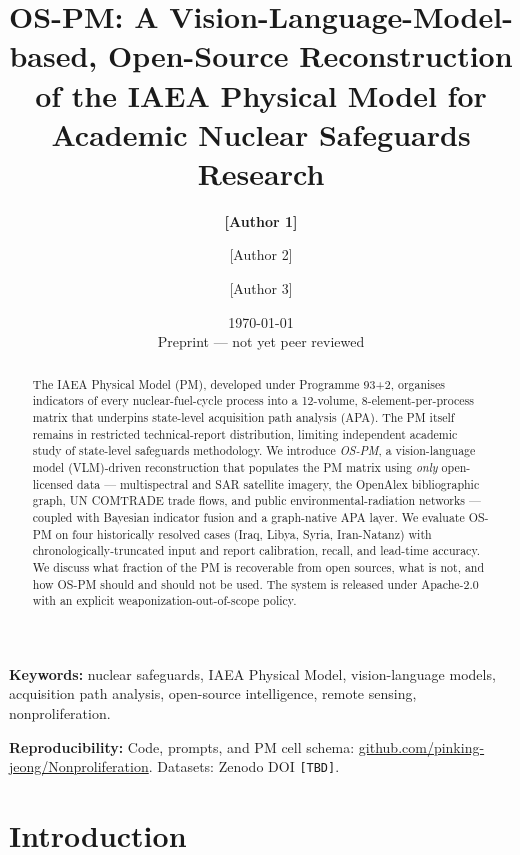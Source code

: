 \documentclass[11pt,a4paper]{article}
\title{\textbf{OS-PM: A Vision-Language-Model-based, Open-Source
  Reconstruction of the IAEA Physical Model for Academic Nuclear
  Safeguards Research}}
\author[1]{\textbf{[Author 1]}}
\author[1]{[Author 2]}
\author[2]{[Author 3]}
\affil[1]{[Institution 1, Country]}
\affil[2]{[Institution 2, Country]}
\date{\today\\[2pt]\small Preprint --- not yet peer reviewed}
\begin{document}
\maketitle

\begin{abstract}
The IAEA Physical Model (PM), developed under Programme 93+2, organises
indicators of every nuclear-fuel-cycle process into a 12-volume,
8-element-per-process matrix that underpins state-level acquisition path
analysis (APA). The PM itself remains in restricted technical-report
distribution, limiting independent academic study of state-level
safeguards methodology. We introduce \emph{OS-PM}, a vision-language
model (VLM)-driven reconstruction that populates the PM matrix using
\emph{only} open-licensed data --- multispectral and SAR satellite
imagery, the OpenAlex bibliographic graph, UN COMTRADE trade flows, and
public environmental-radiation networks --- coupled with Bayesian
indicator fusion and a graph-native APA layer. We evaluate OS-PM on four
historically resolved cases (Iraq, Libya, Syria, Iran-Natanz) with
chronologically-truncated input and report calibration, recall, and
lead-time accuracy. We discuss what fraction of the PM is recoverable
from open sources, what is not, and how OS-PM should and should not be
used. The system is released under Apache-2.0 with an explicit
weaponization-out-of-scope policy.
\end{abstract}

\textbf{Keywords:} nuclear safeguards, IAEA Physical Model, vision-language
models, acquisition path analysis, open-source intelligence, remote
sensing, nonproliferation.

\medskip

\noindent\textbf{Reproducibility:} Code, prompts, and PM cell schema:
\href{https://github.com/pinking-jeong/Nonproliferation}{github.com/pinking-jeong/Nonproliferation}. Datasets:
Zenodo DOI \texttt{[TBD]}.

\section{Introduction}\label{sec:intro}
\end{document}
